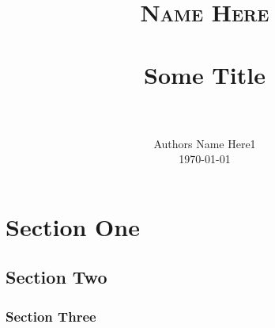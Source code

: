 \documentclass[paper=a4, fontsize=12pt]{scrartcl}
\title{
		\usefont{OT1}{bch}{b}{n}
		\normalfont \normalsize \textsc{ Name Here } \\ [25pt]
		\horrule{0.5pt} \\[0.4cm]
		\huge Some Title \\
		\horrule{2pt} \\[0.5cm]
}
\author{
		\normalfont 								\normalsize
        Authors Name Here1\\[-3pt]		\normalsize
        \newline
        \today\\[-3pt]
}
\date{}
\numberwithin{equation}{section}		%
\numberwithin{figure}{section}			%
\numberwithin{table}{section}				%
\begin{document}
\maketitle

\newpage
\tableofcontents
\newpage
\section{Section One}
\subsection{Section Two}

\subsubsection{Section Three}
\end{document}
